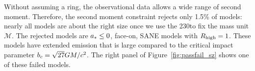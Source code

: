 

Without assuming a ring, the observational  data allows a wide range of second moment.  Therefore, the second moment constraint rejects only 1.5\% of models: nearly all models are about the right size once we use the 230\GHz to fix the mass unit $\mathcal{M}$.  The rejected models are $a_* \le 0$, face-on, SANE models with $R_\mathrm{high} = 1$.  These models have extended emission that is large compared to the critical impact parameter $b_c = \sqrt{27} GM/c^2$.  The right panel of Figure~\ref{fig:passfail_sz} shows one of these failed models.

\label{sec:vam}


